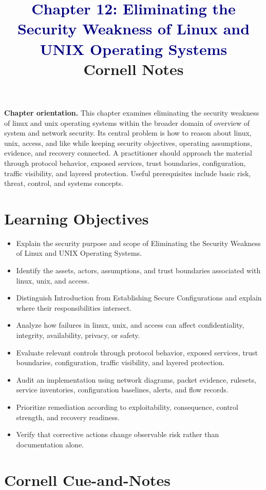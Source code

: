 \documentclass[11pt]{article}
\title{\textcolor{Navy}{Chapter 12: Eliminating the Security Weakness of Linux and UNIX Operating Systems}\\[2mm]\large Cornell Notes}
\author{}
\date{}
\begin{document}
\maketitle
\thispagestyle{fancy}
\vspace{-1.5em}
\begin{orientationbox}
\textbf{Chapter orientation.} This chapter examines eliminating the security weakness of linux and unix operating systems within the broader domain of overview of system and network security. Its central problem is how to reason about linux, unix, access, and like while keeping security objectives, operating assumptions, evidence, and recovery connected. A practitioner should approach the material through protocol behavior, exposed services, trust boundaries, configuration, traffic visibility, and layered protection. Useful prerequisites include basic risk, threat, control, and systems concepts.
\end{orientationbox}
\section*{Learning Objectives}
\begin{itemize}
\item Explain the security purpose and scope of Eliminating the Security Weakness of Linux and UNIX Operating Systems.
\item Identify the assets, actors, assumptions, and trust boundaries associated with linux, unix, and access.
\item Distinguish Introduction from Establishing Secure Configurations and explain where their responsibilities intersect.
\item Analyze how failures in linux, unix, and access can affect confidentiality, integrity, availability, privacy, or safety.
\item Evaluate relevant controls through protocol behavior, exposed services, trust boundaries, configuration, traffic visibility, and layered protection.
\item Audit an implementation using network diagrams, packet evidence, rulesets, service inventories, configuration baselines, alerts, and flow records.
\item Prioritize remediation according to exploitability, consequence, control strength, and recovery readiness.
\item Verify that corrective actions change observable risk rather than documentation alone.
\end{itemize}
\section*{Cornell Cue-and-Notes}
\end{document}
